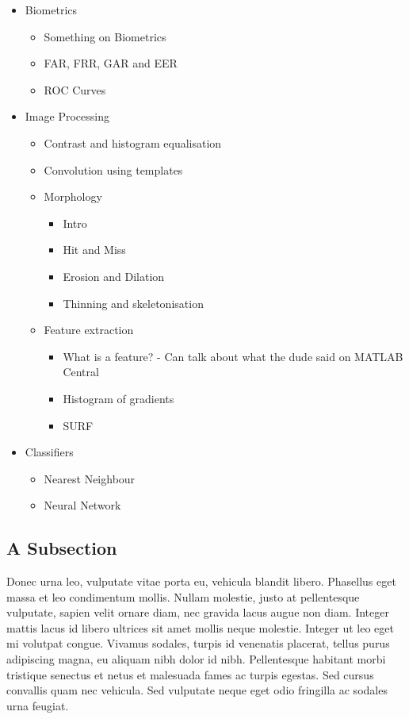 \begin{itemize}
\item Biometrics
	\begin{itemize}
		\item Something on Biometrics
		\item FAR, FRR, GAR and EER
		\item ROC Curves
	\end{itemize}
\item Image Processing
	\begin{itemize}
		\item Contrast and histogram equalisation
		\item Convolution using templates
		\item Morphology
		\begin{itemize}
			\item Intro
			\item Hit and Miss
			\item Erosion and Dilation
			\item Thinning and skeletonisation
		\end{itemize}
		\item Feature extraction
		\begin{itemize}
			\item What is a feature? - Can talk about what the dude said on MATLAB Central
			\item Histogram of gradients
			\item SURF	
		\end{itemize}
	\end{itemize}
\item Classifiers
	\begin{itemize}
			\item Nearest Neighbour
			\item Neural Network
	\end{itemize}
\end{itemize}

\subsection{A Subsection}

Donec urna leo, vulputate vitae porta eu, vehicula blandit libero. Phasellus eget massa et leo condimentum mollis. Nullam molestie, justo at pellentesque vulputate, sapien velit ornare diam, nec gravida lacus augue non diam. Integer mattis lacus id libero ultrices sit amet mollis neque molestie. Integer ut leo eget mi volutpat congue. Vivamus sodales, turpis id venenatis placerat, tellus purus adipiscing magna, eu aliquam nibh dolor id nibh. Pellentesque habitant morbi tristique senectus et netus et malesuada fames ac turpis egestas. Sed cursus convallis quam nec vehicula. Sed vulputate neque eget odio fringilla ac sodales urna feugiat.


